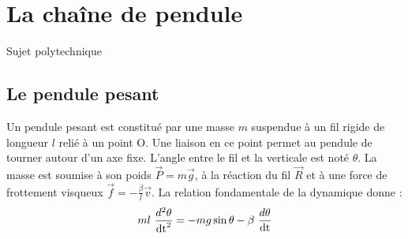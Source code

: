 \section{La chaîne de pendule}

\label{polytechnique-sujet}
\label{polytechnique-corrige}

Sujet polytechnique \cite{soliton-sujet} \cite{soliton-corrige}
\subsection{Le pendule pesant}
\begin{multicols}{2}%

\columnbreak
Un pendule pesant est constitué par une masse $m$ suspendue à un fil rigide de longueur $l$ relié à un point O. Une liaison en ce point permet au pendule de tourner autour d'un axe fixe. L'angle entre le fil et la verticale est noté $\theta$. La masse est soumise à son poids $\overrightarrow{P}=m\overrightarrow{g}$, à la réaction du fil $\overrightarrow{R}$ et à une force de frottement visqueux $\overrightarrow{f}= - \frac{\beta}{l} \overrightarrow{v}$. La relation fondamentale de la dynamique donne :
\[
m l\ \frac{d^2 \theta}{\operatorname{dt}^2} =  - m g \sin{\theta}  -  \beta\ \frac{d \theta}{\operatorname{dt}}
\]
\end{multicols}
%
